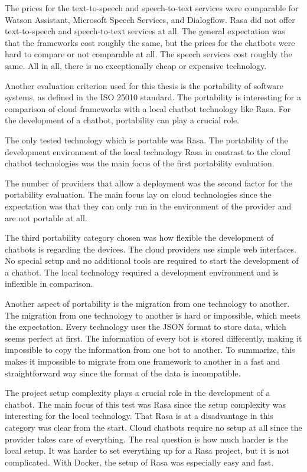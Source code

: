 The prices for the text-to-speech and speech-to-text services were comparable for Watson Assistant, Microsoft Speech Services, and Dialogflow.
Rasa did not offer text-to-speech and speech-to-text services at all.
The general expectation was that the frameworks cost roughly the same, but the prices for the chatbots were hard to compare or not comparable at all.
The speech services cost roughly the same.
All in all, there is no exceptionally cheap or expensive technology.

Another evaluation criterion used for this thesis is the portability of software systems, as defined in the ISO 25010\cite{iso25010} standard.
The portability is interesting for a comparison of cloud frameworks with a  local chatbot technology like Rasa.
For the development of a chatbot, portability can play a crucial role.

The only tested technology which is portable was Rasa. 
The portability of the development environment of the local technology Rasa in contrast to the cloud chatbot technologies was the main focus of the first portability evaluation.

The number of providers that allow a deployment was the second factor for the portability evaluation.
The main focus lay on cloud technologies since the expectation was
that they can only run in the environment of the provider and are 
not portable at all.

The third portability category chosen was how flexible the development
of chatbots is regarding the devices.
The cloud providers use simple web interfaces.
No special setup and no additional tools are required to start the development of a chatbot.
The local technology required a development environment and is inflexible in comparison.

Another aspect of portability is the migration from one technology to another.
The migration from one technology to another is hard or impossible, which meets the expectation.
Every technology uses the JSON format to store data, which seems perfect at first.
The information of every bot is stored differently, making it impossible to copy the information from one bot to another.
To summarize, this makes it impossible to migrate from one framework to another in a fast and straightforward way since the format of the data is incompatible. 

The project setup complexity plays a crucial role in the development of a chatbot.
The main focus of this test was Rasa since the setup complexity was interesting for the local technology.
That Rasa is at a disadvantage in this category was clear from the start.
Cloud chatbots require no setup at all since the provider takes care of everything.
The real question is how much harder is the local setup.
It was harder to set everything up for a Rasa project, but it is not complicated.
With Docker, the setup of Rasa was especially easy and fast.  

